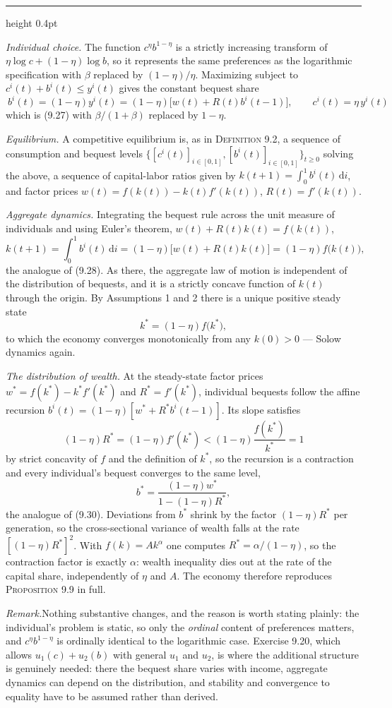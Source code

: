 \documentclass[11pt,letterpaper,reqno]{amsart}
\makeatletter
\newcommand{\dd}{\,\mathrm{d}}
\newcommand{\as@head}[3]{%
  \par\addvspace{1.6ex}\penalty-200\relax
  \phantomsection
  \addcontentsline{toc}{subsection}{#1 #2\texorpdfstring{\ifx\relax#3\relax\else\quad #3\fi}{}}%
  {\color{RuleGrey}\hrule height 0.4pt}%
  \nobreak\vspace{0.8ex}\nobreak
  \noindent{\bfseries #1 #2}%
  \ifx\relax#3\relax\else\quad{\bfseries\itshape #3}\fi
  \par\nobreak\vspace{0.4ex}\nobreak
  \as@beginstatement
}
\newcommand{\as@beginstatement}{\begingroup\itshape\ignorespaces}
\newenvironment{aex}[2]{\as@head{Exercise}{#1}{#2}}{\par\addvspace{1.2ex}}
\newcommand{\rmk}[1]{%
  \par\vspace{0.6ex}%
  {\small\noindent\textit{Remark.}\hspace{0.5em}#1\par}%
  \vspace{0.4ex}%
}
\newcommand{\bk}[1]{\textup{\textsc{#1}}}
\renewcommand{\as@beginstatement}{\ignorespaces}
\makeatother
\begin{document}
\begin{aex}{9.19}{}
\emph{Individual choice.}  The function $c^{\eta}b^{1-\eta}$ is a strictly increasing transform of
$\eta\log c+(1-\eta)\log b$, so it represents the same preferences as the logarithmic
specification with $\beta$ replaced by $(1-\eta)/\eta$.  Maximizing subject to
$c^{i}(t)+b^{i}(t)\le y^{i}(t)$ gives the constant bequest share
\[
\boxed{\ b^{i}(t)=(1-\eta)y^{i}(t)=(1-\eta)\bigl[w(t)+R(t)b^{i}(t-1)\bigr],
\qquad c^{i}(t)=\eta\,y^{i}(t)\ }
\]
which is \bk{(9.27)} with $\beta/(1+\beta)$ replaced by $1-\eta$.

\emph{Equilibrium.}  A competitive equilibrium is, as in \bk{Definition 9.2}, a sequence of
consumption and bequest levels $\{[c^{i}(t)]_{i\in[0,1]},[b^{i}(t)]_{i\in[0,1]}\}_{t\ge0}$
solving the above, a sequence of capital-labor ratios given by $k(t+1)=\int_0^1 b^{i}(t)\dd i$,
and factor prices $w(t)=f(k(t))-k(t)f'(k(t))$, $R(t)=f'(k(t))$.

\emph{Aggregate dynamics.}  Integrating the bequest rule across the unit measure of individuals
and using Euler's theorem, $w(t)+R(t)k(t)=f(k(t))$,
\[
k(t+1)=\int_0^1 b^{i}(t)\dd i=(1-\eta)\bigl[w(t)+R(t)k(t)\bigr]=(1-\eta)f\bigl(k(t)\bigr),
\]
the analogue of \bk{(9.28)}.  As there, the aggregate law of motion is independent of the
distribution of bequests, and it is a strictly concave function of $k(t)$ through the origin.  By
Assumptions 1 and 2 there is a unique positive steady state
\[
k^{*}=(1-\eta)f\bigl(k^{*}\bigr),
\]
to which the economy converges monotonically from any $k(0)>0$ --- Solow dynamics again.

\emph{The distribution of wealth.}  At the steady-state factor prices
$w^{*}=f(k^{*})-k^{*}f'(k^{*})$ and $R^{*}=f'(k^{*})$, individual bequests follow the affine
recursion $b^{i}(t)=(1-\eta)[w^{*}+R^{*}b^{i}(t-1)]$.  Its slope satisfies
\[
(1-\eta)R^{*}=(1-\eta)f'(k^{*})<(1-\eta)\frac{f(k^{*})}{k^{*}}=1
\]
by strict concavity of $f$ and the definition of $k^{*}$, so the recursion is a contraction and
every individual's bequest converges to the same level,
\[
b^{*}=\frac{(1-\eta)w^{*}}{1-(1-\eta)R^{*}} ,
\]
the analogue of \bk{(9.30)}.  Deviations from $b^{*}$ shrink by the factor $(1-\eta)R^{*}$ per
generation, so the cross-sectional variance of wealth falls at the rate $[(1-\eta)R^{*}]^{2}$.
With $f(k)=Ak^{\alpha}$ one computes $R^{*}=\alpha/(1-\eta)$, so the contraction factor is exactly
$\alpha$: wealth inequality dies out at the rate of the capital share, independently of $\eta$
and $A$.  The economy therefore reproduces \bk{Proposition 9.9} in full.

\rmk{Nothing substantive changes, and the reason is worth stating plainly: the individual's
problem is static, so only the \emph{ordinal} content of preferences matters, and
$c^{\eta}b^{1-\eta}$ is ordinally identical to the logarithmic case.  Exercise 9.20, which allows
$u_1(c)+u_2(b)$ with general $u_1$ and $u_2$, is where the additional structure is genuinely
needed: there the bequest share varies with income, aggregate dynamics can depend on the
distribution, and stability and convergence to equality have to be assumed rather than derived.}
\end{aex}
\end{document}
